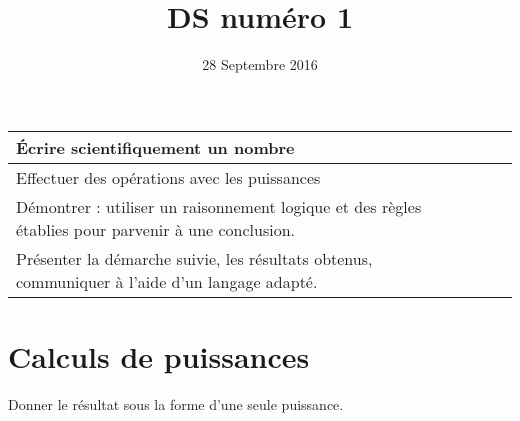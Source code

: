 \documentclass[a4paper,11pt]{exam}
\date{28 Septembre 2016}
\title{DS num\'ero 1}
\makeatletter
\def\maketitle{%
	\par\centering\Huge\textbf{\@title}%
	\par}
\makeatother
\begin{document}
	
	\maketitle

\begin{small}
\begin{center}
	\begin{tabular}{|@{\ }l@{}|@{\ }c@{\ }|}
		\hline
		\'Ecrire scientifiquement un nombre &  \ \ \ \\
		\hline
		Effectuer des opérations avec les puissances &  \\
		\hline
		Démontrer : utiliser un raisonnement logique et des règles établies pour parvenir à une conclusion. &  \\
		\hline
		Présenter la démarche suivie, les résultats obtenus, communiquer à l’aide d’un langage adapté. &  \\
		\hline
	\end{tabular}
\end{center}
\end{small}	
	

\section{Calculs de puissances}

Donner le résultat sous la forme d'une seule puissance.
\end{document}

